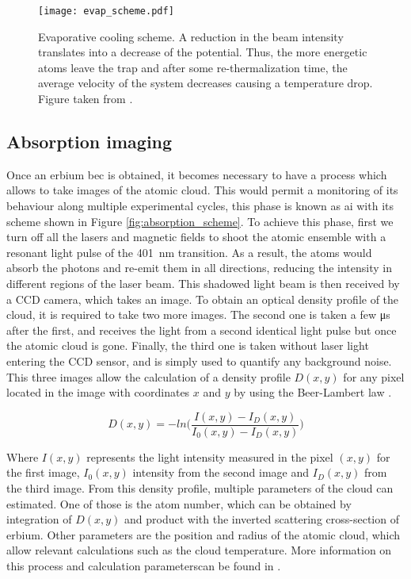 \begin{figure}[!htbp]\centering
	\texttt{[image: evap\_scheme.pdf]}
	\caption[Evaporative cooling scheme]{Evaporative cooling scheme. A reduction in the beam intensity translates into a decrease of the potential. Thus, the more energetic atoms leave the trap and after some re-thermalization time, the average velocity of the system decreases causing a temperature drop. Figure taken from \cite{Rehberger2013}. }\label{fig:evaporative_cooling}
\end{figure}


\subsection{Absorption imaging}

Once an erbium \ac{bec} is obtained, it becomes necessary to have a process which allows to take images of the atomic cloud. This would permit a monitoring of its behaviour along multiple experimental cycles, this phase is known as \Acf{ai} with its scheme shown in Figure \ref{fig:absorption_scheme}. To achieve this phase, first we turn off all the lasers and magnetic fields to shoot the atomic ensemble with a resonant light pulse of the \SI{401}{\nano\meter} transition. As a result, the atoms would absorb the photons and re-emit them in all directions, reducing the intensity in different regions of the laser beam. This shadowed light beam is then received by a CCD camera, which takes an image. To obtain an optical density profile of the cloud, it is required to take two more images. The second one is taken a few \si{\micro\second} after the first, and receives the light from a second identical light pulse but once the atomic cloud is gone. Finally, the third one is taken without laser light entering the CCD sensor, and is simply used to quantify any background noise. This three images allow the calculation of a density profile $D(x,y)$ for any pixel located in the image with coordinates $x$ and $y$ by using the Beer-Lambert law \cite{Ulitzsch2016}.

\begin{equation}
	D(x,y)=-ln\bigg(\frac{I(x,y)-I_{D}(x,y)}{I_0(x,y)-I_D(x,y)}\bigg)
\end{equation}

Where $I(x,y)$ represents the light intensity measured in the pixel $(x,y)$ for the first image,  $I_0(x,y)$ intensity from the second image and $I_D(x,y)$ from the third image. From this density profile, multiple parameters of the cloud can estimated. One of those is the atom number, which can be obtained by integration of $D(x,y)$ and product with the inverted scattering cross-section of erbium. Other parameters are the position and radius of the atomic cloud, which allow relevant calculations such as the cloud temperature. More information on this process and calculation parameterscan be found in \cite{Ulitzsch2016, Roell2016}.


